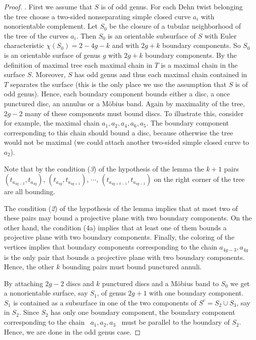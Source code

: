 \documentclass[11 pt]{amsart}
\theoremstyle{definition}
\begin{document}
\begin{proof}
. First we assume that $S$
is of odd genus. For each Dehn twist belonging the tree choose a
two-sided nonseparating simple closed curve $a_i$ with nonorientable
complement.  Let $S_0$ be the closure of a tubular neighborhood of
the tree of the curves $a_i$. Then $S_0$ is an orientable subsurface
of $S$ with Euler characteristic $\chi(S_0)=2-4g-k$ and with $2g+k$
boundary components. So $S_0$ is an orientable surface of genus $g$
with $2g+k$ boundary components. By the definition of maximal tree
each maximal chain in $T$ is a maximal chain in the surface $S$.
Moreover, $S$ has odd genus and thus each maximal chain contained in
$T$ separates the surface (this is the only place we use the
assumption that $S$ is of odd genus). Hence, each boundary component
bounds either a disc, a once punctured disc, an annulus or a
M\"obius band. Again by maximality of the tree, $2g-2$ many of these
components must bound discs. To illustrate this, consider for
example, the maximal chain $a_1,a_2,a_4,a_6,a_5$. The boundary
component corresponding to this chain should bound a disc, because
otherwise the tree would not be maximal (we could attach another
two-sided simple closed curve to $a_2$).

Note that by the condition ({\it 3}) of the hypothesis of the lemma
the $k+1$ pairs $(t_{a_{4g-3}},t_{a_{4g}})$,
$(t_{a_{4g}},t_{a_{4g+1}})$, $\cdots$,
$(t_{a_{4g+k-1}},t_{a_{4g-1}})$ on the right corner of the tree are
all bounding.

The condition ({\it 2}) of the hypothesis of the lemma implies that
at most two of these pairs may bound a projective plane with two
boundary components. On the other hand, the condition (4a) implies
that at least one of them bounds a projective plane with two
boundary components.  Finally, the coloring of the vertices implies
that boundary components corresponding to the chain
$a_{4g-3},a_{4g}$ is the only pair that bounds a projective plane
with two boundary components. Hence, the other $k$ bounding pairs
must bound punctured annuli.

By attaching $2g-2$ discs and $k$ punctured discs and a M\"obius
band to $S_0$ we get a nonorientable surface, say $S_1$, of genus
$2g+1$ with one boundary component. $S_1$ is contained as a
subsurface in one of the two components of $S^c=S_2 \cup S_3$, say
in $S_2$. Since $S_2$ has only one boundary component, the boundary
component corresponding to the chain \ $a_1,a_2,a_3$ \ must be
parallel to the boundary of $S_2$. Hence, we are done in the odd
genus case.


\end{proof}
\end{document}

